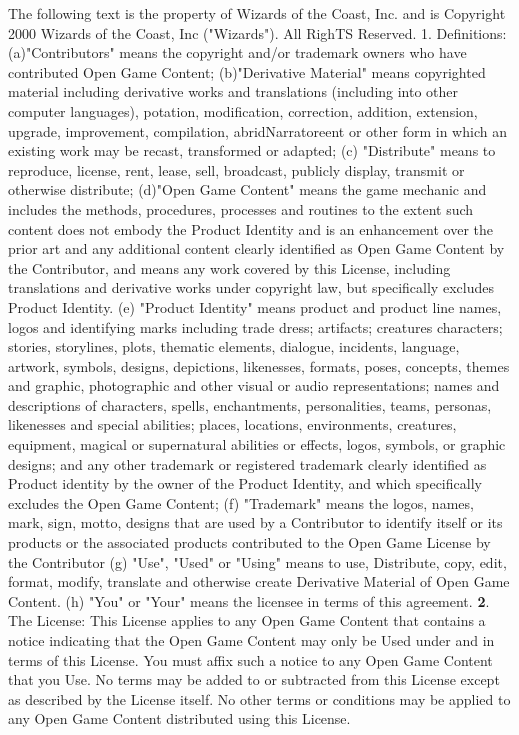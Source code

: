 \documentclass[a4paper,11pt,twoside,openany]{book}
\begin{document}
{{			The following text is the property of Wizards of the Coast, Inc. and is Copyright 2000 Wizards of the Coast, Inc ("Wizards"). All RighTS Reserved.
			1. Definitions: (a)"Contributors" means the copyright and/or trademark owners who have contributed Open Game Content; (b)"Derivative Material" means copyrighted material including derivative works and translations (including into other computer languages), potation, modification, correction, addition, extension, upgrade, improvement, compilation, abridNarratoreent or other form in which an existing work may be recast, transformed or adapted; (c) "Distribute" means to reproduce, license, rent, lease, sell, broadcast, publicly display, transmit or otherwise distribute; (d)"Open Game Content" means the game mechanic and includes the methods, procedures, processes and routines to the extent such content does not embody the Product Identity and is an enhancement over the prior art and any additional content clearly identified as Open Game Content by the Contributor, and means any work covered by this License, including translations and derivative works under copyright law, but specifically excludes Product Identity. (e) "Product Identity" means product and product line names, logos and identifying marks including trade dress; artifacts; creatures characters; stories, storylines, plots, thematic elements, dialogue, incidents, language, artwork, symbols, designs, depictions, likenesses, formats, poses, concepts, themes and graphic, photographic and other visual or audio representations; names and descriptions of characters, spells, enchantments, personalities, teams, personas, likenesses and special abilities; places, locations, environments, creatures, equipment, magical or supernatural abilities or effects, logos, symbols, or graphic designs; and any other trademark or registered trademark clearly identified as Product identity by the owner of the Product Identity, and which specifically excludes the Open Game Content; (f) "Trademark" means the logos, names, mark, sign, motto, designs that are used by a Contributor to identify itself or its products or the associated products contributed to the Open Game License by the Contributor (g) "Use", "Used" or "Using" means to use, Distribute, copy, edit, format, modify, translate and otherwise create Derivative Material of Open Game Content. (h) "You" or "Your" means the licensee in terms of this agreement.
			\textbf{2}. The License: This License applies to any Open Game Content that contains a notice indicating that the Open Game Content may only be Used under and in terms of this License. You must affix such a notice to any Open Game Content that you Use. No terms may be added to or subtracted from this License except as described by the License itself. No other terms or conditions may be applied to any Open Game Content distributed using this License.
}}
\end{document}
